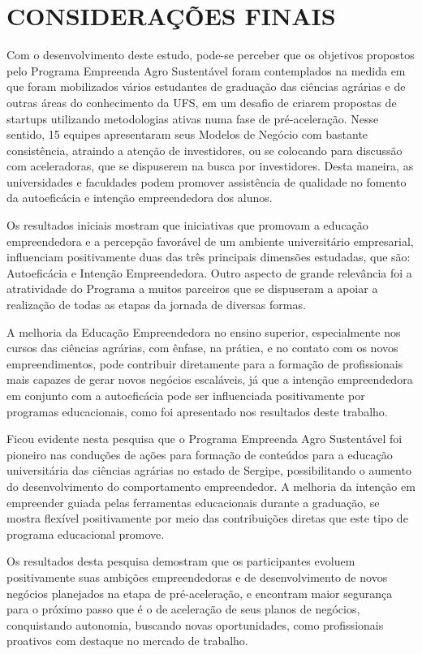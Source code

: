 \chapter{CONSIDERAÇÕES FINAIS}


Com o desenvolvimento deste estudo, pode-se perceber que os objetivos propostos pelo Programa Empreenda Agro Sustentável foram contemplados na medida em que foram mobilizados vários estudantes de graduação das ciências agrárias e de outras áreas do conhecimento da UFS, em um desafio de criarem propostas de startups utilizando metodologias ativas numa fase de pré-aceleração. Nesse sentido, 15 equipes apresentaram seus Modelos de Negócio com bastante consistência, atraindo a atenção de investidores, ou se colocando para discussão com aceleradoras, que se dispuserem na busca por investidores. Desta maneira, as universidades e faculdades podem promover assistência de qualidade no fomento da autoeficácia e intenção empreendedora dos alunos.


Os resultados iniciais mostram que iniciativas que promovam a educação empreendedora e a percepção favorável de um ambiente universitário empresarial, influenciam positivamente duas das três principais dimensões estudadas, que são: Autoeficácia e Intenção Empreendedora. Outro aspecto de grande relevância foi a atratividade do Programa a muitos parceiros que se dispuseram a apoiar a realização de todas as etapas da jornada de diversas formas.

A melhoria da Educação Empreendedora no ensino superior, especialmente nos cursos das ciências agrárias, com ênfase, na prática, e no contato com os novos empreendimentos, pode contribuir diretamente para a formação de profissionais mais capazes de gerar novos negócios escaláveis, já que a intenção empreendedora em conjunto com a autoeficácia pode ser influenciada positivamente por programas educacionais, como foi apresentado nos resultados deste trabalho.

Ficou evidente nesta pesquisa que o Programa Empreenda Agro Sustentável foi pioneiro nas conduções de ações para formação de conteúdos para a educação universitária das ciências agrárias no estado de Sergipe, possibilitando o aumento do desenvolvimento do comportamento empreendedor. A melhoria da intenção em empreender guiada pelas ferramentas educacionais durante a graduação, se mostra flexível positivamente por meio das contribuições diretas que este tipo de programa educacional promove.

Os resultados desta pesquisa demostram que os participantes evoluem positivamente suas ambições empreendedoras e de desenvolvimento de novos negócios planejados na etapa de pré-aceleração, e encontram maior segurança para o próximo passo que é o de aceleração de seus planos de negócios, conquistando autonomia, buscando novas oportunidades, como profissionais proativos com destaque no mercado de trabalho.

